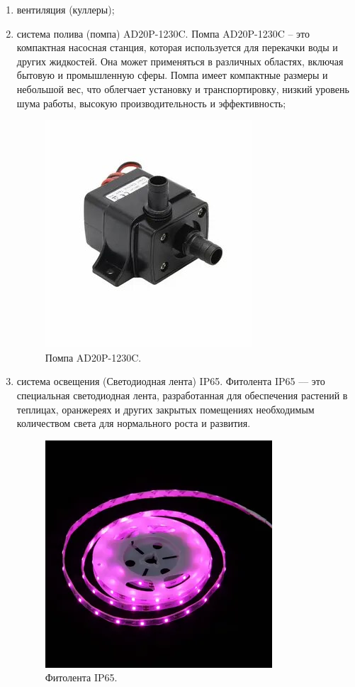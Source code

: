 \begin{enumerate}
    \item вентиляция (куллеры);
    
    \item система полива (помпа) AD20P-1230C. Помпа AD20P-1230C – это компактная насосная станция, которая используется для перекачки воды и других жидкостей. Она может применяться в различных областях, включая бытовую и промышленную сферы. Помпа имеет компактные размеры и небольшой вес, что облегчает установку и транспортировку, низкий уровень шума работы, высокую производительность и эффективность;

    \begin{figure}[H]
        \centering
        \includegraphics[scale=0.6]{images/pump.jpg}
        \caption{Помпа AD20P-1230C.}
        \label{fig:pump}
    \end{figure}
    
    \item система освещения (Светодиодная лента) IP65. Фитолента IP65 –-- это специальная светодиодная лента, разработанная для обеспечения растений в теплицах, оранжереях и других закрытых помещениях необходимым количеством света для нормального роста и развития.

    \begin{figure}[H]
        \centering
        \includegraphics[scale=0.8]{images/ip65.png}
        \caption{Фитолента IP65.}
        \label{fig:ip65}
    \end{figure}
    

\end{enumerate}
